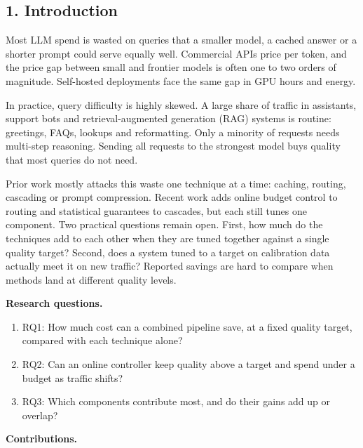 \documentclass[
  10pt,
]{article}
\providecommand{\tightlist}{%
  \setlength{\itemsep}{0pt}\setlength{\parskip}{0pt}}
\begin{document}
\subsection{1. Introduction}\label{introduction}

Most LLM spend is wasted on queries that a smaller model, a cached
answer or a shorter prompt could serve equally well. Commercial APIs
price per token, and the price gap between small and frontier models is
often one to two orders of magnitude. Self-hosted deployments face the
same gap in GPU hours and energy.

In practice, query difficulty is highly skewed. A large share of traffic
in assistants, support bots and retrieval-augmented generation (RAG)
systems is routine: greetings, FAQs, lookups and reformatting. Only a
minority of requests needs multi-step reasoning. Sending all requests to
the strongest model buys quality that most queries do not need.

Prior work mostly attacks this waste one technique at a time: caching,
routing, cascading or prompt compression. Recent work adds online budget
control to routing and statistical guarantees to cascades, but each
still tunes one component. Two practical questions remain open. First,
how much do the techniques add to each other when they are tuned
together against a single quality target? Second, does a system tuned to
a target on calibration data actually meet it on new traffic? Reported
savings are hard to compare when methods land at different quality
levels.

\textbf{Research questions.}

\begin{enumerate}
\def\labelenumi{\arabic{enumi}.}
\tightlist
\item
  RQ1: How much cost can a combined pipeline save, at a fixed quality
  target, compared with each technique alone?
\item
  RQ2: Can an online controller keep quality above a target and spend
  under a budget as traffic shifts?
\item
  RQ3: Which components contribute most, and do their gains add up or
  overlap?
\end{enumerate}

\textbf{Contributions.}
\end{document}
